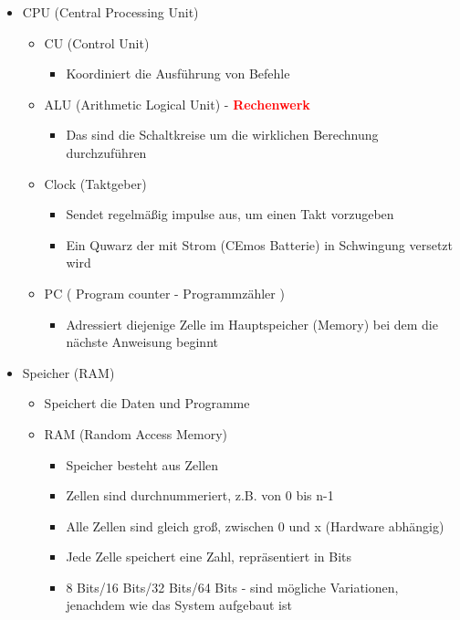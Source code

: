 \begin{itemize}

	\item CPU (Central Processing Unit)
	
	\begin{itemize}
		
		\item CU (Control Unit)
		
		\begin{itemize}
			\item Koordiniert die Ausführung von Befehle
		\end{itemize}
		
		\item ALU (Arithmetic Logical Unit) - \textcolor{red}{\textbf{Rechenwerk}}
		\begin{itemize}
			\item Das sind die Schaltkreise um die wirklichen Berechnung durchzuführen
		\end{itemize}
		
		\item Clock (Taktgeber)
		\begin{itemize}
			\item Sendet regelmäßig impulse aus, um einen Takt vorzugeben
			\item Ein Quwarz der mit Strom (CEmos Batterie) in Schwingung versetzt wird
		\end{itemize}
		
		\item PC ( Program counter - Programmzähler )
		\begin{itemize}
			\item Adressiert diejenige Zelle im Hauptspeicher (Memory) bei dem die nächste Anweisung beginnt
		\end{itemize}
	\end{itemize}
	
	\item Speicher (RAM)
	\begin{itemize}
		\item Speichert die Daten und Programme
		\item RAM (Random Access Memory)
		\begin{itemize}
			\item Speicher besteht aus Zellen
			\item Zellen sind durchnummeriert, z.B. von 0 bis n-1
			\item Alle Zellen sind gleich groß, zwischen 0 und x (Hardware abhängig)
			\item Jede Zelle speichert eine Zahl, repräsentiert in Bits
			\item 8 Bits/16 Bits/32 Bits/64 Bits - sind mögliche Variationen, jenachdem wie das System aufgebaut ist
		\end{itemize}
	\end{itemize}



\end{itemize}
